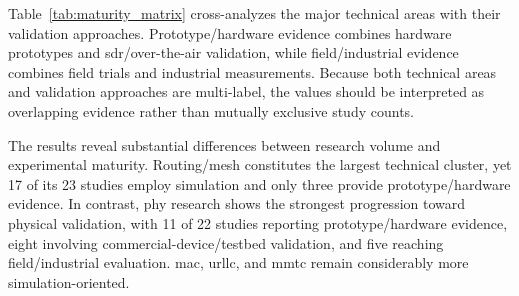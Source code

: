 \documentclass[conference]{IEEEtran}
\begin{document}
Table~\ref{tab:maturity_matrix} cross-analyzes the major technical
areas with their validation approaches. Prototype/hardware evidence
combines hardware prototypes and \gls{sdr}/over-the-air validation,
while field/industrial evidence combines field trials and industrial
measurements. Because both technical areas and validation approaches
are multi-label, the values should be interpreted as overlapping
evidence rather than mutually exclusive study counts.

\begin{table}[!t]
\centering
\caption{Experimental maturity across major \gls{dectnr} research
areas in the 51-study corpus. Categories are multi-label; therefore,
individual studies may contribute to multiple research areas and
validation approaches.}
\label{tab:maturity_matrix}
\end{table}

The results reveal substantial differences between research volume
and experimental maturity. Routing/mesh constitutes the largest
technical cluster, yet 17 of its 23 studies employ simulation and
only three provide prototype/hardware evidence. In contrast,
\gls{phy} research shows the strongest progression toward physical
validation, with 11 of 22 studies reporting prototype/hardware
evidence, eight involving commercial-device/testbed validation, and
five reaching field/industrial evaluation. \gls{mac}, \gls{urllc},
and \gls{mmtc} remain considerably more simulation-oriented.
\end{document}
